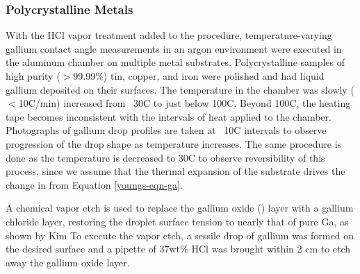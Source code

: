 
\subsubsection{Polycrystalline Metals}

With the HCl vapor treatment added to the procedure, temperature-varying gallium contact angle measurements in an argon environment were executed in the aluminum chamber on multiple metal substrates. Polycrystalline samples of high purity ($>$99.99\%) tin, copper, and iron were polished and had liquid gallium deposited on their surfaces. The temperature in the chamber was slowly ($<$10\degree C/min) increased from ~30\degree C to just below 100\degree C. Beyond 100\degree C, the heating tape becomes inconsistent with the intervals of heat applied to the chamber. Photographs of gallium drop profiles are taken at ~10\degree C intervals to observe progression of the drop shape as temperature increases. The same procedure is done as the temperature is decreased to 30\degree C to observe reversibility of this process, since we assume that the thermal expansion of the substrate drives the change in \gamSL from Equation \ref{youngs-eqn-ga}. 

A chemical vapor etch is used to replace the gallium oxide () layer with a gallium chloride layer, restoring the droplet surface tension to nearly that of pure Ga, as shown by Kim \etal To execute the vapor etch, a sessile drop of gallium was formed on the desired surface and a pipette of 37wt\% HCl was brought within 2 cm to etch away the gallium oxide layer. 


